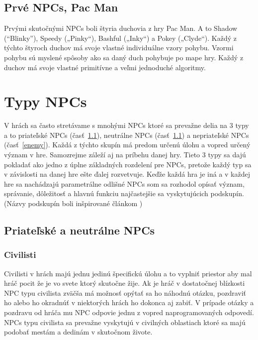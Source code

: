 \documentclass[10pt,twoside,slovak,a4paper]{article}
\begin{document}
\subsection{Prvé NPCs, Pac Man} %
Prvými skutočnými NPCs boli štyria duchovia z hry Pac Man. A to Shadow (“Blinky”), Speedy („Pinky“), Bashful („Inky“) a Pokey („Clyde“). Každý z týchto štyroch duchov má svoje vlastné individuálne vzory pohybu. Vzormi pohybu sú myslené spôsoby ako sa daný duch pohybuje po mape hry. Každý z duchov má svoje vlastné primitívne a veľmi jednoduché algoritmy. \cite{Hack2018}
 



\section{Typy NPCs}     \label{Typy}
V hrách sa často stretávame s mnohými NPCs ktoré sa prevažne delia na 3 typy a to priateľské NPCs (časť~\ref{Ally & non}), neutrálne NPCs (časť~\ref{Ally & non}) a nepriateľské NPCs (časť~\ref{enemy}). Každá z týchto skupín má predom určenú úlohu a vopred určený význam v hre. Samozrejme záleží aj na príbehu danej hry. Tieto 3 typy sa dajú pokladať ako jedno z úplne základných rozdelení pre NPCs, pretože každý typ sa v závislosti na danej hre ešte ďalej rozvetvuje. Keďže každá hra je iná a v každej hre sa nachádzajú parametrálne odlišné NPCs som sa rozhodol opísať význam, správanie, dôležitosť a hlavnú funkciu najčastejšie sa vyskytujúcich podskupín. (Názvy podskupín boli inšpirované článkom \cite{phdthesis})

\subsection{Priateľské a neutrálne NPCs}  \label{Ally & non}  

\subsubsection{Civilisti} 
Civilisti v hrách majú jednu jedinú špecifickú úlohu a to vyplniť priestor aby mal hráč pocit že je vo svete ktorý skutočne žije. Ak je hráč v dostatočnej blízkosti NPC typu civilista zväčša má možnosť opýtať sa ho náhodnú otázku, pozdraviť ho alebo ho okradnúť v niektorých hrách ho dokonca aj zabiť. V prípade otázky a pozdravu od hráča mu NPC odpovie jednu z vopred naprogramovaných odpovedí. NPCs typu civilista sa prevažne vyskytujú v civilných oblastiach ktoré sa majú podobať mestám a dedinám v skutočnom živote.  
\end{document}
